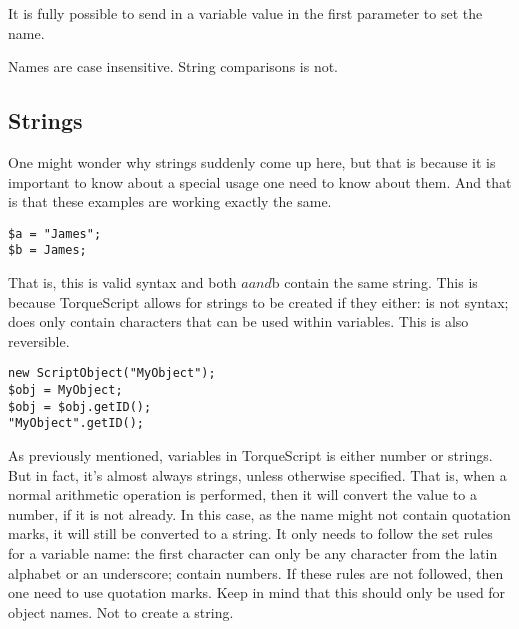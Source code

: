 It is fully possible to send in a variable value in the first parameter to set the name.

Names are case insensitive. String comparisons is not.

\subsection{Strings}

One might wonder why strings suddenly come up here, but that is because it is important to know about a special usage one need to know about them. And that is that these examples are working exactly the same.

\begin{lstlisting}[style=ts]
$a = "James";
$b = James;
\end{lstlisting}

That is, this is valid syntax and both $a and $b contain the same string. This is because TorqueScript allows for strings to be created if they either: is not syntax; does only contain characters that can be used within variables. This is also reversible.

\begin{lstlisting}[style=ts]
new ScriptObject("MyObject");
$obj = MyObject;
$obj = $obj.getID();
"MyObject".getID();
\end{lstlisting}

As previously mentioned, variables in TorqueScript is either number or strings. But in fact, it’s almost always strings, unless otherwise specified. That is, when a normal arithmetic operation is performed, then it will convert the value to a number, if it is not already. In this case, as the name might not contain quotation marks, it will still be converted to a string. It only needs to follow the set rules for a variable name: the first character can only be any character from the latin alphabet or an underscore; contain numbers. If these rules are not followed, then one need to use quotation marks. Keep in mind that this should only be used for object names. Not to create a string.
